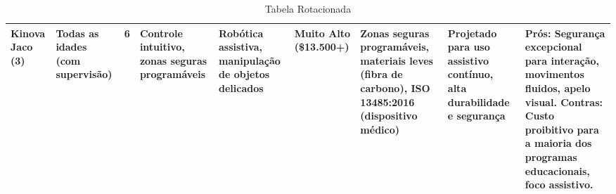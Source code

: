 \documentclass{article}
\begin{document}
\begin{table}[h!]
{\begin{tabular}{p{1.5cm}p{2cm}p{2cm}p{2cm}p{2cm}p{2cm}p{2cm}p{2cm}p{2cm}}
Kinova Jaco (3)                         & Todas as idades (com supervisão)          & 6                                 & Controle intuitivo, zonas seguras programáveis                                           & Robótica	assistiva, manipulação de objetos delicados                                 & Muito Alto (\$13.500+)        & Zonas seguras programáveis, materiais leves (fibra de carbono), ISO 13485:2016 (dispositivo médico)               & Projetado para uso assistivo contínuo, alta durabilidade e segurança                                          & Prós: Segurança excepcional para interação, movimentos fluidos, apelo visual. Contras: Custo proibitivo para a maioria dos programas educacionais, foco assistivo.                                 \\ \bottomrule
\end{tabular}
    }
    \caption{Tabela Rotacionada}
    \label{tab:tabela_rotacionada}
\end{table}
\end{document}
